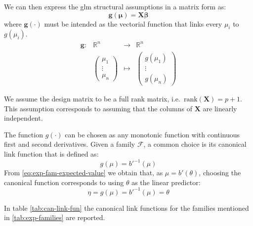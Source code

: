 \documentclass[a4paper, twoside, openright, 12pt]{report}
\theoremstyle{definition}
\theoremstyle{definition}
\theoremstyle{definition}
\theoremstyle{remark}
\begin{document}
We can then express the \ac{glm} structural assumptions in a matrix form as:
\[
\boldsymbol{g}(\boldsymbol{\mu}) = \boldsymbol{X} \boldsymbol{\beta}
\]
where \(\boldsymbol{g}(\cdot)\) must be intended as the vectorial function that links every \(\mu_i\) to \(g(\mu_i)\).
\[
\begin{array}{cccc}
\boldsymbol{g}: & \mathbb{R}^n & \longrightarrow & \mathbb{R}^n \\
                & \left(
                    \begin{matrix} \mu_1  \\ \vdots \\ \mu_n \end{matrix}
                  \right)
                  & \longmapsto & 
                  \left(
                    \begin{matrix} g(\mu_1)  \\ \vdots \\ g(\mu_n) \end{matrix}
                  \right)
\end{array}
\]

We assume the design matrix to be a full rank matrix, i.e.~\(\text{rank}(\boldsymbol{X}) = p+1\). This assumption corresponds to assuming that the columns of \(\boldsymbol{X}\) are linearly independent.

The function \(g(\cdot)\) can be chosen as any monotonic function with continuous first and second derivatives. Given a family \(\mathcal{F}\), a common choice is its canonical link function that is defined as:
\[
g(\mu) = b'^{-1}(\mu)
\]
From \eqref{eq:exp-fam-expected-value} we obtain that, as \(\mu = b'(\theta)\), choosing the canonical function corresponds to using \(\theta\) as the linear predictor:
\[
\eta = g(\mu) = b'^{-1}(\mu) = \theta
\]

In table \ref{tab:can-link-fun} the canonical link functions for the families mentioned in \ref{tab:exp-families} are reported.
\end{document}
